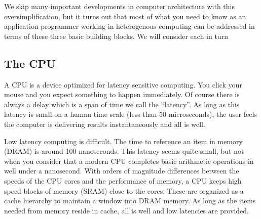 We skip many important developments in computer architecture with this oversimplification, but 
it turns out that most of what you need to know as an application programmer working in 
heterogenous computing can be addressed in terms of these three basic building blocks.
We will consider each in turn

\subsection{The CPU}

A CPU is a device optimized for latency sensitive computing.  You click your mouse and you expect something to happen
immediately.  Of course there is always a delay which is a span of time we call the ``latency''.  As long as this
latency is small on a human time scale (less than 50 microseconds), the user feels the computer is delivering results
instantaneously and  all is well.  

Low latency computing is difficult.  The time to reference an item in memory (DRAM) is around 100 nanoseconds.  This latency
seems quite small, but not when you consider that a modern CPU completes basic arithmetic operations in well
under a nanosecond.  With orders of magnitude differences between the speeds of the CPU cores and the performance
of memory, a CPU keeps high speed blocks of memory (SRAM) close to the cores.  These are organized as a 
cache hierarchy to maintain a window into DRAM memory.  As long as the items needed from memory 
reside in cache, all is well and low latencies are provided.  

